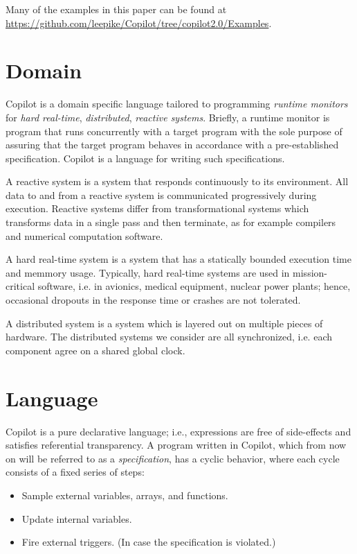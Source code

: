 \documentclass[]{article}
\theoremstyle{example}
\begin{document}
Many of the examples in this paper can be found at \url{https://github.com/leepike/Copilot/tree/copilot2.0/Examples}.
\section{Domain}

Copilot is a domain specific language tailored to programming \emph{runtime
monitors} for \emph{hard real-time}, \emph{distributed}, \emph{reactive systems}.
Briefly, a runtime monitor is program that runs concurrently with a target program
with the sole purpose of assuring that the target program behaves in accordance with a
pre-established specification. Copilot is a language for writing such specifications.

A reactive system is a system that responds continuously to its environment.
All data to and from a reactive system is communicated progressively during
execution. Reactive systems differ from transformational systems which transforms
data in a single pass and then terminate, as for example compilers and numerical
computation software.

A hard real-time system is a system that has a statically bounded execution time and memmory usage.
Typically, hard real-time systems are used in mission-critical software, i.e.
in avionics, medical equipment, nuclear power plants; hence, occasional dropouts
in the response time or crashes are not tolerated.

A distributed system is a system which is layered out on multiple pieces of hardware.
The distributed systems we consider are all synchronized, i.e. each component agree on
a shared global clock.

\section{Language}

Copilot is a pure declarative language; i.e., expressions are free of side-effects
and satisfies referential transparency.
A program written in Copilot, which from now on will be referred to as a \emph{specification},
has a cyclic behavior, where each cycle consists of a fixed series of steps:

\begin{itemize}
\item Sample external variables, arrays, and functions.
\item Update internal variables.
\item Fire external triggers. (In case the specification is violated.)
\end{itemize}
\end{document}
